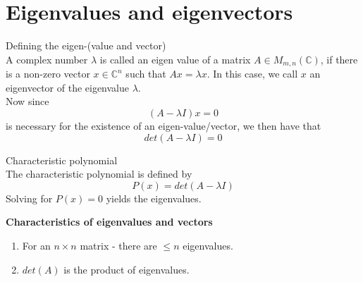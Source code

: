 \documentclass[journal, letterpaper]{IEEEtran}
\begin{document}
    \section{Eigenvalues and eigenvectors}
    \begin{mybox}{Defining the eigen-(value and vector)} \\ 
        A complex number $\lambda$ is called an eigen value of a matrix $A \in M_{m, n}(\mathbb{C})$, if there is a non-zero vector $x \in \mathbb{C}^n$ such that $Ax = \lambda x$. In this case, we call $x$ an eigenvector of the eigenvalue $\lambda$.
        \newline \\ 
        Now since 
        $$ (A - \lambda I)x = 0$$
        is necessary for the existence of an eigen-value/vector, we then have that
        $$ det(A - \lambda I) = 0$$
    \end{mybox}
    \begin{myboxr}{Characteristic polynomial} \\ 
        The characteristic polynomial is defined by
        $$ P(x) = det(A - \lambda I)$$
        Solving for $P(x) = 0$ yields the eigenvalues.
    \end{myboxr}
    \textbf{Characteristics of eigenvalues and vectors}
    \begin{enumerate}
        \item For an $n \times n$ matrix - there are $\le n$ eigenvalues.
        \item $det(A)$ is the product of eigenvalues.
    \end{enumerate}
\end{document}
